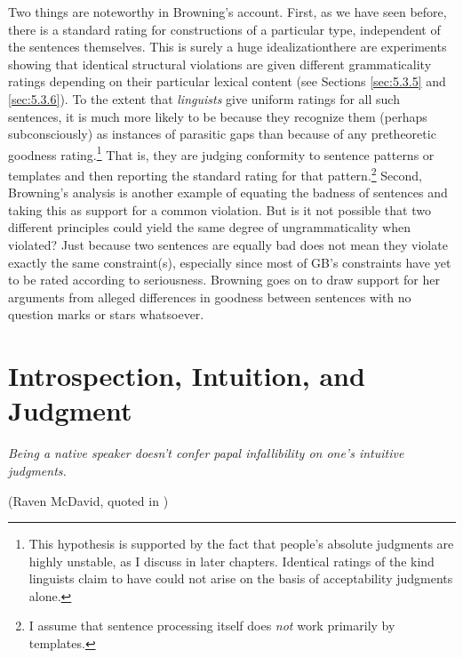 \noindent
Two things are noteworthy in Browning's account. First, as we have seen before, there is a standard rating for constructions of a particular type, independent of the sentences themselves. This is surely a huge idealization\schdash{}there are experiments showing that identical structural violations are given different grammaticality ratings depending on their particular lexical content (see Sections \ref{sec:5.3.5} and \ref{sec:5.3.6}).
To the extent that \textit{linguists} give uniform ratings for all such sentences, it is much more likely to be because they recognize them (perhaps subconsciously) as instances of parasitic gaps than because of any pretheoretic goodness rating.\footnote{This hypothesis is supported by the fact that people's absolute judgments are highly unstable, as I discuss in later chapters. Identical ratings of the kind linguists claim to have could not arise on the basis of acceptability judgments alone.}
 That is, they are judging conformity to sentence patterns or templates and then reporting the standard rating for that pattern.\footnote{I assume that sentence processing itself does \textit{not} work primarily by templates.} Second, Browning's analysis is another example of equating the badness of sentences and taking this as support for a common violation. But is it not possible that two different principles could yield the same degree of ungrammaticality when violated? Just because two sentences are equally bad does not mean they violate exactly the same constraint(s), especially since most of GB's constraints have yet to be rated according to seriousness. Browning goes on to draw support for her arguments from alleged differences in goodness between sentences with no question marks or stars whatsoever.

\section{Introspection, Intuition, and Judgment} \label{sec:2.4}

\epigraph{\textit{Being a native speaker doesn't confer papal infallibility on one's intuitive judgments.\\[-2\baselineskip]}}{(Raven McDavid, quoted in \citealt{Paikeday1985})}

